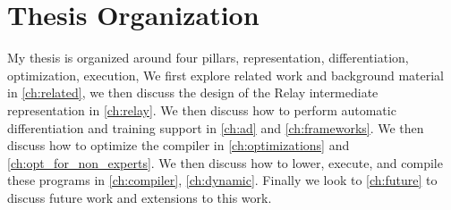 \section{Thesis Organization}

My thesis is organized around four pillars, representation, differentiation, optimization, execution,
We first explore related work and background material
  in \ref{ch:related}, we then discuss the design of the Relay intermediate representation in \ref{ch:relay}.
We then discuss how to perform automatic differentiation and training support in \ref{ch:ad} and
  \ref{ch:frameworks}.
We then discuss how to optimize the compiler in \ref{ch:optimizations} and \ref{ch:opt_for_non_experts}.
We then discuss how to lower, execute, and compile these programs in
\ref{ch:compiler}, \ref{ch:dynamic}.
Finally we look to \ref{ch:future} to discuss future work and extensions to this work.





